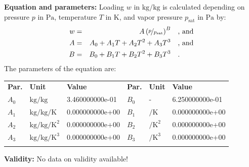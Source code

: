 \textbf{Equation and parameters:}
\newline
%
Loading $w$ in $\si{\kilogram\per\kilogram}$ is calculated depending on pressure $p$ in $\si{\pascal}$, temperature $T$ in $\si{\kelvin}$, and vapor pressure $p_\mathrm{sat}$ in $\si{\pascal}$ by:
%
\begin{equation*}
\begin{split}
w &=& A \left( \nicefrac{p}{p_\mathrm{sat}} \right) ^{B} & \quad\text{, and} \\
A &=& A_0 + A_1 T + A_2 T^2 + A_3 T^3 & \quad\text{, and} \\
B &=& B_0 + B_1 T + B_2 T^2 + B_3 T^3 & \quad\text{.} \\
\end{split}
\end{equation*}
%
The parameters of the equation are:
%
\begin{longtable}[l]{lll|lll}
\toprule
\addlinespace
\textbf{Par.} & \textbf{Unit} & \textbf{Value} &	\textbf{Par.} & \textbf{Unit} & \textbf{Value} \\
\addlinespace
\midrule
\endhead

\bottomrule
\endfoot
\bottomrule
\endlastfoot
\addlinespace

$A_0$ & $\si{\kilogram\per\kilogram}$ & 3.460000000e-01 & $B_0$ & - & 6.250000000e-01 \\
$A_1$ & $\si{\kilogram\per\kilogram\per\kelvin}$ & 0.000000000e+00 & $B_1$ & $\si{\per\kelvin}$ & 0.000000000e+00 \\
$A_2$ & $\si{\kilogram\per\kilogram\per\square\kelvin}$ & 0.000000000e+00 & $B_2$ & $\si{\per\square\kelvin}$ & 0.000000000e+00 \\
$A_3$ & $\si{\kilogram\per\kilogram\per\cubic\kelvin}$ & 0.000000000e+00 & $B_3$ & $\si{\per\cubic\kelvin}$ & 0.000000000e+00 \\

\addlinespace\end{longtable}

\textbf{Validity:}
\newline
No data on validity available!
\newline


